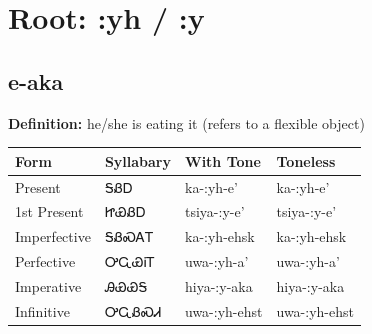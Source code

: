 \documentclass{article}%
\begin{document}
%
\normalsize%
\section*{Root: :yh / :y}%
\subsection*{e-aka}%
\textbf{Definition: }%
he/she is eating it (refers to a flexible object)%
\\[0.5em]%
\begin{tabular}{|l|l|l|l|}%
\hline%
\textbf{Form}&\textbf{Syllabary}&\textbf{With Tone}&\textbf{Toneless}\\%
\hline%
Present&ᎦᏰᎠ&ka{-}:yh{-}e'&ka{-}:yh{-}e'\\%
1st Present&ᏥᏯᏰᎠ&tsiya{-}:y{-}e'&tsiya{-}:y{-}e'\\%
Imperfective&ᎦᏰᏍᎪᎢ&ka{-}:yh{-}ehsk&ka{-}:yh{-}ehsk\\%
Perfective&ᎤᏩᏯᎥᎢ&uwa{-}:yh{-}a'&uwa{-}:yh{-}a'\\%
Imperative&ᎯᏯᏯᎦ&hiya{-}:y{-}aka&hiya{-}:y{-}aka\\%
Infinitive&ᎤᏩᏰᏍᏗ&uwa{-}:yh{-}ehst&uwa{-}:yh{-}ehst\\%
\hline%
\end{tabular}%
\\[1em]%
\end{document}
